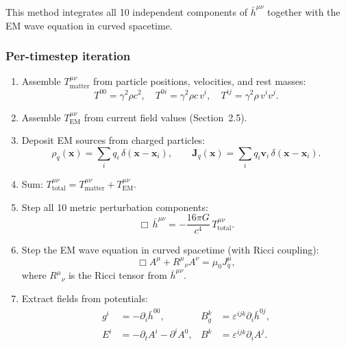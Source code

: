 \documentclass[11pt,a4paper]{article}
\newcommand{\vv}[1]{\mathbf{#1}}
\begin{document}
This method integrates all 10 independent components of $\bar{h}^{\mu\nu}$ together with the EM wave equation in curved spacetime.

\subsubsection*{Per-timestep iteration}
\begin{enumerate}
  \item Assemble $T^{\mu\nu}_{\mathrm{matter}}$ from particle positions, velocities, and rest masses:
  \begin{equation}
    T^{00} = \gamma^2\rho c^2,\quad T^{0i} = \gamma^2\rho c\,v^i,\quad T^{ij} = \gamma^2\rho\,v^i v^j.
  \end{equation}

  \item Assemble $T^{\mu\nu}_{\mathrm{EM}}$ from current field values (Section~2.5).

  \item Deposit EM sources from charged particles:
  \begin{equation}
    \rho_q(\vv{x}) = \sum_i q_i\,\delta(\vv{x}-\vv{x}_i), \qquad
    \vv{J}_q(\vv{x}) = \sum_i q_i\vv{v}_i\,\delta(\vv{x}-\vv{x}_i).
  \end{equation}

  \item Sum: $T^{\mu\nu}_{\mathrm{total}} = T^{\mu\nu}_{\mathrm{matter}} + T^{\mu\nu}_{\mathrm{EM}}$.

  \item Step all 10 metric perturbation components:
  \begin{equation}
    \Box\,\bar{h}^{\mu\nu} = -\frac{16\pi G}{c^4}\,T^{\mu\nu}_{\mathrm{total}}.
  \end{equation}

  \item Step the EM wave equation in curved spacetime (with Ricci coupling):
  \begin{equation}
    \Box A^\mu + R^\mu{}_\nu A^\nu = \mu_0 J^\mu_q,
  \end{equation}
  where $R^\mu{}_\nu$ is the Ricci tensor from $\bar{h}^{\mu\nu}$.

  \item Extract fields from potentials:
  \begin{align}
    g^i  &= -\partial_i\bar{h}^{00}, &
    B_g^k &= \varepsilon^{ijk}\partial_i\bar{h}^{0j}, \\
    E^i  &= -\partial_t A^i - \partial^i A^0, &
    B^k  &= \varepsilon^{ijk}\partial_i A^j.
  \end{align}


\end{enumerate}
\end{document}
